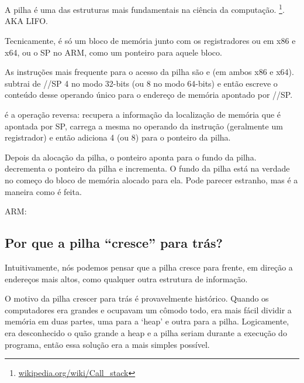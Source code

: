 \chapter{\Stack}
\label{sec:stack}
\myindex{\Stack}

A pilha é uma das estruturas mais fundamentais na ciência da computação.
\footnote{\href{http://go.yurichev.com/17119}{wikipedia.org/wiki/Call\_stack}}.
\ac{AKA} \ac{LIFO}.

Tecnicamente, é só um bloco de memória junto com os registradores \ESP ou \RSP em x86 e x64, ou o \ac{SP} no ARM, como um ponteiro para aquele bloco.

As instruções mais frequente para o acesso da pilha são \PUSH e \POP (em ambos x86 e x64).
\PUSH subtrai de \ESP/\RSP/\ac{SP} 4 no modo 32-bits (ou 8 no modo 64-bits) e então escreve o conteúdo desse operando único para o endereço de memória apontado por \ESP/\RSP/\ac{SP}.

\POP é a operação reversa: recupera a informação da localização de memória que é apontada por \ac{SP}, 
carrega a mesma no operando da instrução (geralmente um registrador) e então adiciona 4 (ou 8) para o ponteiro da pilha.

Depois da alocação da pilha, o ponteiro aponta para o fundo da pilha.
\PUSH decrementa o ponteiro da pilha e \POP incrementa. O fundo da pilha está na verdade no começo do bloco de memória alocado para ela.
Pode parecer estranho, mas é a maneira como é feita.

ARM: \PTBRph{}

\section{Por que a pilha ``cresce'' para trás?}
\label{stack_grow_backwards}

Intuitivamente, nós podemos pensar que a pilha cresce para frente, em direção a endereços mais altos, como qualquer outra estrutura de informação.

O motivo da pilha crescer para trás é provavelmente histórico. Quando os computadores era grandes e ocupavam um cômodo todo, era mais fácil dividir a memória em duas partes, uma para a ‘heap’ e outra para a pilha.
Logicamente, era desconhecido o quão grande a heap e a pilha seriam durante a execução do programa, então essa solução era a mais simples possível.



